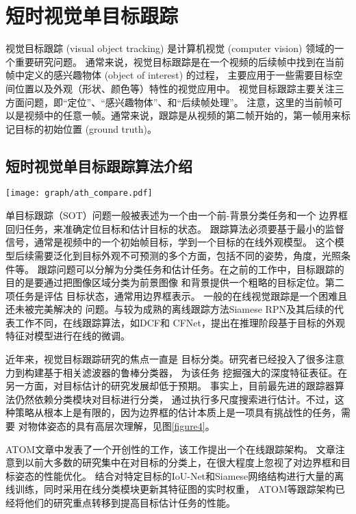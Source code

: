 \documentclass[promaster]{thesis-uestc}
\begin{document}
\section{短时视觉单目标跟踪}
视觉目标跟踪 (visual object tracking) 是计算机视觉 (computer vision) 领域的一个重要研究问题。
通常来说，视觉目标跟踪是在一个视频的后续帧中找到在当前帧中定义的感兴趣物体 (object of interest) 的过程，
主要应用于一些需要目标空间位置以及外观（形状、颜色等）特性的视觉应用中。
视觉目标跟踪主要关注三方面问题，即“定位”、“感兴趣物体”、和“后续帧处理”。
注意，这里的当前帧可以是视频中的任意一帧。通常来说，跟踪是从视频的第二帧开始的，第一帧用来标记目标的初始位置 (ground truth)。





\subsection{短时视觉单目标跟踪算法介绍}
\begin{figure*}[htp!]
	\centering  
	\texttt{[image: graph/ath\_compare.pdf]}
    \caption{本文提出的短时跟踪器与当前最先进水平跟踪器效果的比较。}
	\label{figure4}
\end{figure*}

单目标跟踪（SOT）问题一般被表述为一个由一个前-背景分类任务和一个
边界框回归任务，来准确定位目标和估计目标的状态。
跟踪算法必须要基于最小的监督信号，通常是视频中的一个初始帧目标，学到一个目标的在线外观模型。
这个模型后续需要泛化到目标外观不可预测的多个方面，包括不同的姿势，角度，光照条件等。
跟踪问题可以分解为分类任务和估计任务。在之前的工作中，目标跟踪的目的是要通过把图像区域分类为前景图像
和背景提供一个粗略的目标定位。第二项任务是评估
目标状态，通常用边界框表示。
一般的在线视觉跟踪是一个困难且还未被完美解决的
问题。与较为成熟的离线跟踪方法Siamese RPN及其后续的代表工作不同，在线跟踪算法，如DCF\cite{wang2017dcfnet}和
CFNet\cite{valmadre2017end}，提出在推理阶段基于目标的外观特征对模型进行在线的微调。

近年来，视觉目标跟踪研究的焦点一直是
目标分类。研究者已经投入了很多注意力到构建基于相关滤波器的鲁棒分类器\cite{lunevzivc2018discriminative}， 为该任务
挖掘强大的深度特征表征\cite{bhat2018unveiling}。在另一方面，对目标估计的研究发展却低于预期。
事实上，目前最先进的跟踪器算法\cite{lunevzivc2018discriminative}仍然依赖分类模块对目标进行分类，
通过执行多尺度搜索进行估计。不过，这种策略从根本上是有限的，因为边界框的估计本质上是一项具有挑战性的任务，需要
对物体姿态的具有高层次理解，见图\ref{figure4}。

ATOM\cite{danelljan2019atom}文章中发表了一个开创性的工作，该工作提出一个在线跟踪架构。
文章注意到以前大多数的研究集中在对目标的分类上，在很大程度上忽视了对边界框和目标姿态的性能优化。
结合对特定目标的IoU-Net\cite{jiang2018acquisition}和Siamese网络结构进行大量的离线训练，同时采用在线分类模块更新其特征图的实时权重，
ATOM等跟踪架构已经将他们的研究重点转移到提高目标估计任务的性能。
\end{document}
